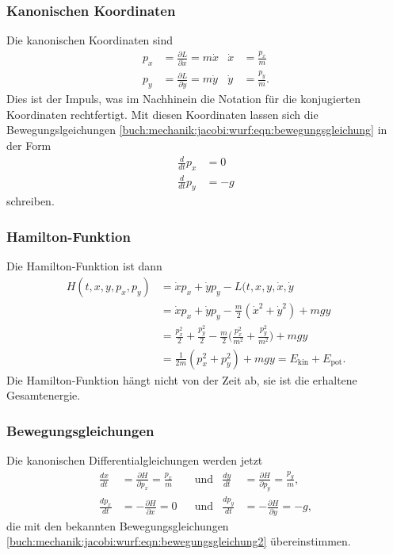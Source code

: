 %
%
\subsubsection{Kanonischen Koordinaten}
%
Die kanonischen Koordinaten sind
\begin{align*}
p_x &= \frac{\partial L}{\partial \dot{x}} = m\dot{x}
&
\dot{x}
&=
\frac{p_x}{m}
\\
p_y &= \frac{\partial L}{\partial \dot{y}} = m\dot{y}
&
\dot{y}
&=
\frac{p_y}{m}.
\end{align*}
Dies ist der Impuls, was im Nachhinein die Notation für die
%
konjugierten Koordinaten rechtfertigt.
Mit diesen Koordinaten lassen sich die Bewegungslgeichungen 
\eqref{buch:mechanik:jacobi:wurf:eqn:bewegungsgleichung} in der
Form
\begin{equation}
\begin{aligned}
\frac{d}{dt}p_x &= 0\\
\frac{d}{dt}p_y &= -g
\end{aligned}
\label{buch:mechanik:jacobi:wurf:eqn:bewegungsgleichung2}
\end{equation}
schreiben.

%
%
\subsubsection{Hamilton-Funktion}
Die Hamilton-Funktion ist dann
%
\begin{align*}
H(t,x,y,p_x,p_y)
&=
\dot{x}p_x
+
\dot{y}p_y
-
L(t,x,y,\dot{x},\dot{y}
\\
&=
\dot{x}p_x
+
\dot{y}p_y
-
\frac{m}2(\dot{x}^2+\dot{y}^2)
+mgy
\\
&=
\frac{p_x^2}{2}
+
\frac{p_y^2}{2}
-
\frac{m}2\biggl(\frac{p_x^2}{m^2} + \frac{p_y^2}{m^2}\biggr) + mgy
\\
&=
\frac{1}{2m}(p_x^2+p_y^2) + mgy
=
E_{\text{kin}} + E_{\text{pot}}.
\end{align*}
Die Hamilton-Funktion hängt nicht von der Zeit ab, sie ist die erhaltene
Gesamtenergie.

%
%
\subsubsection{Bewegungsgleichungen}
Die kanonischen Differentialgleichungen werden jetzt
\begin{align*}
\frac{dx}{dt}
&=
\frac{\partial H}{\partial p_x}
=
\frac{p_x}{m}
&&\text{und}&
\frac{dy}{dt}
&=
\frac{\partial H}{\partial p_y}
=
\frac{p_y}{m},
\\
\frac{dp_x}{dt}
&=
-\frac{\partial H}{\partial x}
=
0
&&\text{und}&
\frac{dp_y}{dt}
&=
-\frac{\partial H}{\partial y}
=
-g,
\end{align*}
die mit den bekannten Bewegungsgleichungen
%
\eqref{buch:mechanik:jacobi:wurf:eqn:bewegungsgleichung2}
übereinstimmen.

